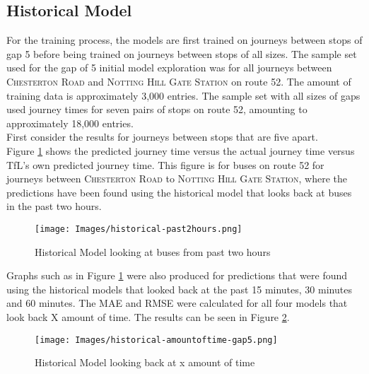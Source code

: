 \subsection{Historical Model}

For the training process, the models are first trained on journeys between stops of gap 5 before being trained on journeys between stops of all sizes. The sample set used for the gap of 5 initial model exploration was for all journeys between \textsc{Chesterton Road} and \textsc{Notting Hill Gate Station} on route 52. The amount of training data is approximately 3,000 entries. The sample set with all sizes of gaps used journey times for seven pairs of stops on route 52, amounting to approximately 18,000 entries. \\

First consider the results for journeys between stops that are five apart. \\

Figure \ref{fig:historical-past2hours} shows the predicted journey time versus the actual journey time versus TfL's own predicted journey time. This figure is for buses on route 52 for journeys between \textsc{Chesterton Road} to \textsc{Notting Hill Gate Station}, where the predictions have been found using the historical model that looks back at buses in the past two hours. 

\begin{figure}[H]
\begin{center}
    \texttt{[image: Images/historical-past2hours.png]}
    \caption{Historical Model looking at buses from past two hours}
    \label{fig:historical-past2hours}
\end{center}
\end{figure}

Graphs such as in Figure \ref{fig:historical-past2hours} were also produced for predictions that were found using the historical models that looked back at the past 15 minutes, 30 minutes and 60 minutes. The MAE and RMSE were calculated for all four models that look back X amount of time. The results can be seen in Figure \ref{fig:historical-lookingbacktime}. 

\begin{figure}[H]
\begin{center}
    \texttt{[image: Images/historical-amountoftime-gap5.png]}
    \caption{Historical Model looking back at x amount of time}
    \label{fig:historical-lookingbacktime}
\end{center}
\end{figure}

